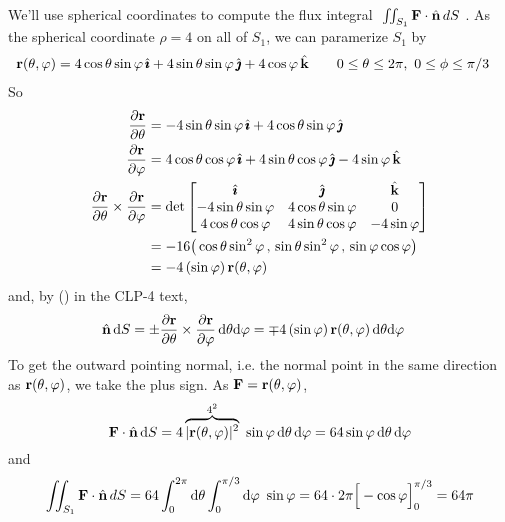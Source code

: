 \begin{solution}
We'll use spherical coordinates to compute the flux integral 
$\ \iint_{S_1}\mathbf{F}\cdot\hat{\mathbf{n}} \,dS\ $. As the spherical coordinate
$\rho=4$ on all of $S_1$, we can paramerize $S_1$ by
\begin{align*}
\vr(\theta,\varphi) & = 4\cos\theta\sin\varphi \,\hi
                      + 4\sin\theta\sin\varphi \,\hj
                      + 4\cos\varphi \,\hk\qquad
0 \le \theta \le 2 \pi,\ 
0 \le \phi \le \pi/3
\end{align*}
So
\begin{align*}
\frac{\partial\mathbf{r}}{\partial\theta}
&= -4\sin\theta\sin\varphi \,\hat{\pmb{\imath}}
                      + 4\cos\theta\sin\varphi \,\hat{\pmb{\jmath}} \\
\frac{\partial\mathbf{r}}{\partial\varphi}
&= 4\cos\theta\cos\varphi \,\hat{\pmb{\imath}}
                      + 4\sin\theta\cos\varphi \,\hat{\pmb{\jmath}}
                      - 4\sin\varphi \,\hat{\mathbf{k}} \\
\frac{\partial\mathbf{r}}{\partial\theta}\times\frac{\partial\mathbf{r}}{\partial\varphi}
&= \det\left[\begin{matrix} \hat{\pmb{\imath}} & \hat{\pmb{\jmath}} & \hat{\mathbf{k}} \\
-4\sin\theta\sin\varphi & 4\cos\theta\sin\varphi & 0 \\
4\cos\theta\cos\varphi & 4\sin\theta\cos\varphi & -4\sin\varphi 
             \end{matrix}\right] \\
&= -16\big(\cos\theta\sin^2\varphi\,,\, \sin\theta\sin^2\varphi\,,\,
                    \sin\varphi\cos\varphi\big) \\
&= -4\,(\sin\varphi)\,\mathbf{r}(\theta,\varphi)
\end{align*}
and, by () in the CLP-4 text,
\begin{align*}
\hat{\mathbf{n}}\,\mathrm{d}S &= \pm\frac{\partial\mathbf{r}}{\partial\theta}\times
            \frac{\partial\mathbf{r}}{\partial\varphi}\,\mathrm{d}\theta\mathrm{d}\varphi
= \mp 4\,(\sin\varphi)\,\mathbf{r}(\theta,\varphi)\,\mathrm{d}\theta\mathrm{d}\varphi  
\end{align*}
To get the outward pointing normal, i.e. the normal point in the same direction
as $\mathbf{r}(\theta,\varphi)$, we take the plus sign. As $\mathbf{F} = \mathbf{r}(\theta,\varphi)$,
\begin{equation*}
\vF\cdot \hn\,\dee{S}
= 4\overbrace{|\vr(\theta,\varphi)|^2}^{4^2}\ \sin\varphi\,\dee{\theta}\,\dee{\varphi}
= 64 \sin\varphi\,\dee{\theta}\,\dee{\varphi}
\end{equation*}
and
\begin{align*}
\iint_{S_1}\mathbf{F}\cdot\hat{\mathbf{n}} \,dS
= 64 \int_{0}^{2\pi} \mathrm{d}\theta \int_{0}^{\pi/3}\mathrm{d}\varphi\  \sin \varphi
= 64 \cdot 2\pi \Big[ - \cos \varphi \Big]_0^{\pi/3}
= 64 \pi
\end{align*}


\end{solution}
